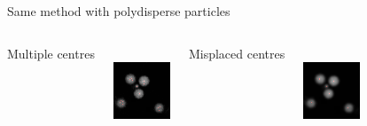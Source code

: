 \begin{frame}{Same method with polydisperse particles}
	\begin{columns}[T]
	\centering
	{\strut{}Multiple centres}\\
	\includegraphics[width=\textwidth]{dillute_smaller_blur0_5}
	\centering
	{\strut{}Misplaced centres}\\
	\includegraphics[width=\textwidth]{dillute_smaller_blur1}

\end{columns}
\end{frame}
